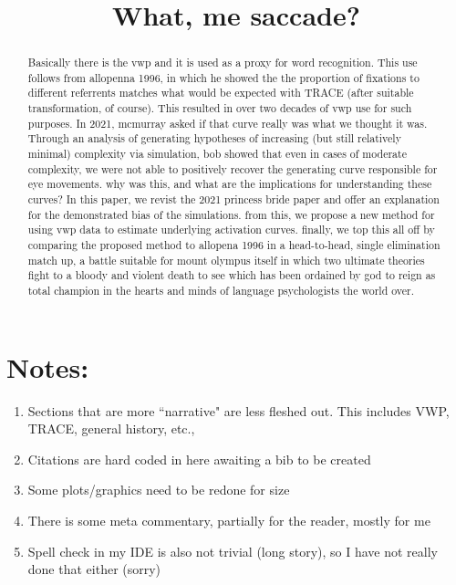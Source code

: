 \documentclass{article}
\title{What, me saccade?}
\date{}
\begin{document}

\maketitle

%

\begin{abstract}
Basically there is the vwp and it is used as a proxy for word recognition. This use follows from allopenna 1996, in which he showed the the proportion of fixations to different referrents matches what would be expected with TRACE (after suitable transformation, of course). This resulted in over two decades of vwp use for such purposes. In 2021, mcmurray asked if that curve really was what we thought it was. Through an analysis of generating hypotheses of increasing (but still relatively minimal) complexity via simulation, bob showed that even in cases of moderate complexity, we were not able to positively recover the generating curve responsible for eye movements. why was this, and what are the implications for understanding these curves? In this paper, we revist the 2021 princess bride paper and offer an explanation for the demonstrated bias of the simulations. from this, we propose a new method for using vwp data to estimate underlying activation curves. finally, we top this all off by comparing the proposed method to allopena 1996 in a head-to-head, single elimination match up, a battle suitable for mount olympus itself in which two ultimate theories fight to a bloody and violent death to see which has been ordained by god to reign as total champion in the hearts and minds of language psychologists the world over.
\end{abstract}

\section*{Notes:}

\begin{singlespace}
\begin{enumerate}
\vspace{-3mm}
\item Sections that are more ``narrative" are less fleshed out. This includes VWP, TRACE, general history, etc.,
\item Citations are hard coded in here awaiting a bib to be created
\item Some plots/graphics need to be redone for size
\item There is some meta commentary, partially for the reader, mostly for me
\item Spell check in my IDE is also not trivial (long story), so I have not really done that either (sorry)
\end{enumerate}
\end{singlespace}
\end{document}
